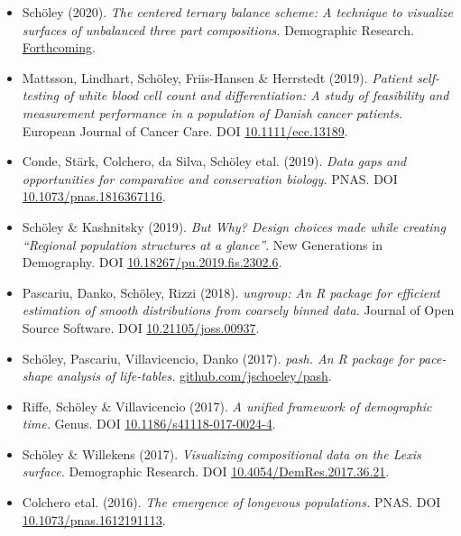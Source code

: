 \documentclass[10pt, twoside]{book}
\begin{document}
\begin{itemize}
\item Schöley (2020). \emph{The centered ternary balance scheme: A technique to visualize surfaces of unbalanced three part compositions.} Demographic Research. \href{https://github.com/jschoeley/ctbs}{Forthcoming}.
\item Mattsson, Lindhart, Schöley, Friis-Hansen \& Herrstedt (2019). \emph{Patient self-testing of white blood cell count and differentiation: A study of feasibility and measurement performance in a population of Danish cancer patients.} European Journal of Cancer Care. DOI \href{https://onlinelibrary.wiley.com/doi/full/10.1111/ecc.13189}{10.1111/ecc.13189}.
\item Conde, Stärk, Colchero, da Silva, Schöley etal. (2019). \emph{Data gaps and opportunities for comparative and conservation biology.} PNAS. DOI \href{https://www.pnas.org/content/116/19/9658}{10.1073/pnas.1816367116}.
\item Schöley \& Kashnitsky (2019). \emph{But Why? Design choices made while creating ``Regional population structures at a glance''}. New Generations in Demography. DOI \href{https://oeconomica.vse.cz/vydavani-publikaci/informace-pro-ctenare/seznam-vsech-vydanych-titulu/publikace-2018-az-2002/jakub-fischer-petr-mazouch-klara-hulikova-tesarkova-olga-kurtinova-new-generations-in-demography-new-challenging-adventures-in-the-population-science/}{10.18267/pu.2019.fis.2302.6}.
\item Pascariu, Danko, Schöley, Rizzi (2018). \emph{ungroup: An R package for efficient estimation of smooth distributions from coarsely binned data.} Journal of Open Source Software. DOI \href{https://joss.theoj.org/papers/10.21105/joss.00937}{10.21105/joss.00937}.
\item Schöley, Pascariu, Villavicencio, Danko (2017). \emph{pash. An R package for pace-shape analysis of life-tables.} \href{https://github.com/jschoeley/pash}{github.com/jschoeley/pash}.
\item Riffe, Schöley \& Villavicencio (2017). \emph{A unified framework of demographic time.} Genus. DOI \href{https://genus.springeropen.com/articles/10.1186/s41118-017-0024-4}{10.1186/s41118-017-0024-4}.
\item Schöley \& Willekens (2017). \emph{Visualizing compositional data on the Lexis surface.} Demographic Research. DOI \href{https://www.demographic-research.org/volumes/vol36/21/}{10.4054/DemRes.2017.36.21}.
\item Colchero etal. (2016). \emph{The emergence of longevous populations.} PNAS. DOI \href{https://www.pnas.org/content/113/48/E7681}{10.1073/pnas.1612191113}.
\end{itemize}
\clearpage
\end{document}
